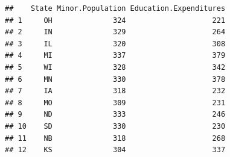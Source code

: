 \documentclass[]{book}
\begin{document}
\begin{verbatim}
##    State Minor.Population Education.Expenditures
## 1     OH              324                    221
## 2     IN              329                    264
## 3     IL              320                    308
## 4     MI              337                    379
## 5     WI              328                    342
## 6     MN              330                    378
## 7     IA              318                    232
## 8     MO              309                    231
## 9     ND              333                    246
## 10    SD              330                    230
## 11    NB              318                    268
## 12    KS              304                    337
\end{verbatim}


\end{document}
